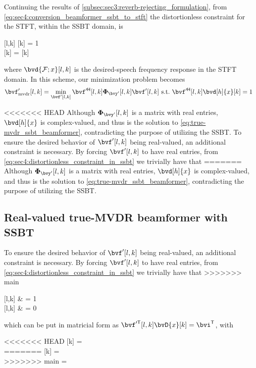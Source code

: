 Continuing the results of \cref{subsec:sec3:reverb-rejecting_formulation}, from \cref{eq:sec4:conversion_beamformer_ssbt_to_stft} the distortionless constraint for the STFT, within the SSBT domain, is
\begin{subgather}
	\label{eq:sec4:distortionless_constraint_in_ssbt}
	[l,k]  = 1 \\
    [k] = \he{\bvA} [k]
\end{subgather}
where $\bvd{\F;x}[l,k]$ is the desired-speech frequency response in the STFT domain. In this scheme, our minimization problem becomes
\begin{equation}
	\label{eq:true-mvdr_ssbt_beamformer}
	\bvf'_{\mvdr}[l,k] = \min_{\bvf'[l,k]} \he{\bvf'}[l,k] \Corr{\bvy'}[l,k] \bvf'[l,k]~\text{s.t.}~\he{\bvf'}[l,k] \bvd[h]{x}[k] = 1
\end{equation}

<<<<<<< HEAD
Although $\Corr{\bvy'}[l,k]$ is a matrix with real entries, $\bvd[h]{x}$ is complex-valued, and thus is the solution to \cref{eq:true-mvdr_ssbt_beamformer}, contradicting the purpose of utilizing the SSBT. To ensure the desired behavior of $\bvf'[l,k]$ being real-valued, an additional constraint is necessary. By forcing $\bvf'[l,k]$ to have real entries, from \cref{eq:sec4:distortionless_constraint_in_ssbt} we trivially have that
=======
Although $\Corr{\bvy'}[l,k]$ is a matrix with real entries, $\bvd[h]{x}$ is complex-valued, and thus is the solution to \cref{eq:true-mvdr_ssbt_beamformer}, contradicting the purpose of utilizing the SSBT.

\subsection{Real-valued true-MVDR beamformer with SSBT}

To ensure the desired behavior of $\bvf'[l,k]$ being real-valued, an additional constraint is necessary. By forcing $\bvf'[l,k]$ to have real entries, from \cref{eq:sec4:distortionless_constraint_in_ssbt} we trivially have that
>>>>>>> main
\begin{subalign}
	[l,k]  & = 1 \\
	[l,k]  & = 0	
\end{subalign}
which can be put in matricial form as $\tr{\bvf'}[l,k] \bvD{x}[k] = \tr{\bvi}$, with
\begin{subgather}
<<<<<<< HEAD
	 =  \\
=======
	 =  \\
>>>>>>> main
	\bvi = 
\end{subgather}

